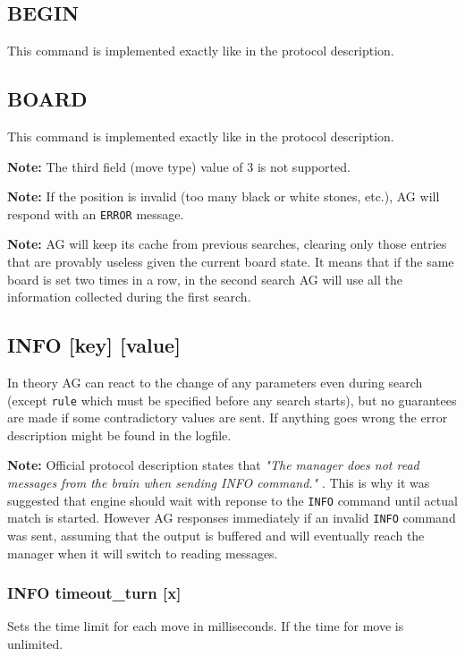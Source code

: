 \documentclass[12pt,a4paper]{article}
\begin{document}
\subsection{BEGIN}
\label{cmd_begin}
This command is implemented exactly like in the protocol description.


\subsection{BOARD}
\label{cmd_board}
This command is implemented exactly like in the protocol description.

\textbf{Note:} The third field (move type) value of 3 is not supported. 

\textbf{Note:} If the position is invalid (too many black or white stones, etc.), AG will respond with an \texttt{ERROR} message.

\textbf{Note:} AG will keep its cache from previous searches, clearing only those entries that are provably useless given the current board state. It means that if the same board is set two times in a row, in the second search AG will use all the information collected during the first search.


\subsection{INFO [key] [value]}
\label{cmd_info}
In theory AG can react to the change of any parameters even during search (except \texttt{rule} which must be specified before any search starts), but no guarantees are made if some contradictory values are sent. If anything goes wrong the error description might be found in the logfile.

\textbf{Note:} Official protocol description states that \textit{"The manager does not read messages from the brain when sending INFO command."} \cite{newprotocol}. This is why it was suggested that engine should wait with reponse to the \texttt{INFO} command until actual match is started. However AG responses immediately if an invalid \texttt{INFO} command was sent, assuming that the output is buffered and will eventually reach the manager when it will switch to reading messages.

\subsubsection{INFO timeout{\_}turn [x]}
\label{cmd_info_timeout_turn}
Sets the time limit for each move in milliseconds. If  the time for move is unlimited.
\end{document}

